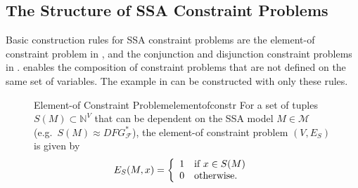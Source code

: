 \subsection{The Structure of SSA Constraint Problems}

    Basic construction rules for SSA constraint problems are the element-of
    constraint problem in ,
    and the conjunction and disjunction constraint problems in
    .
     enables the composition of constraint problems that are
    not defined on the same set of variables.
    The example in  can be constructed with only
    these rules.

\begin{figure}[p]
    \begin{definition}{Element-of Constraint Problem}{elementofconstr}
        For a set of tuples $S(M)\subset\mathbb N^V$ that can be dependent on
        the SSA model $M\in\mathcal M$ (e.g.\ $S(M)\approx DFG_\mathcal F^*$),
        the element-of constraint problem $(V,E_S)$ is given by
        \begin{align*}
            E_S(M,x)=\left\{\begin{array}{l}
                                1\text{\quad if }x \in S(M)\\
                                0\text{\quad otherwise}.
                            \end{array}\right.
        \end{align*}
    \end{definition}


\end{figure}
